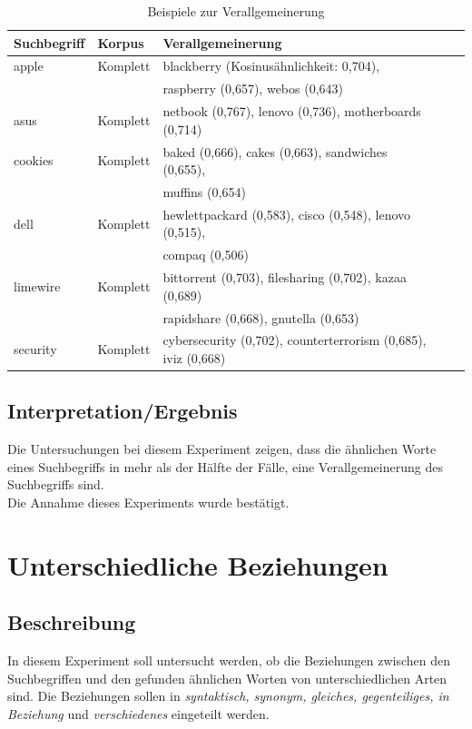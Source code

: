 \documentclass[12pt,a4paper]{report}
\begin{document}
		
\begin{table}[H]
\caption{Beispiele zur Verallgemeinerung}
\begin{center}
\begin{tabular}{|l||l|l|l|l|}
\hline
Suchbegriff & Korpus & Verallgemeinerung   \\
\hline
\hline
 apple & Komplett & blackberry (Kosinusähnlichkeit: 0,704),\\
 	&	& raspberry (0,657), webos (0,643)\\
 \hline
 asus	   & Komplett & netbook (0,767), lenovo (0,736), motherboards (0,714) \\
\hline
 cookies	& Komplett& baked (0,666), cakes (0,663), sandwiches (0,655),\\
 & & muffins (0,654)	\\
 	\hline
 dell	 & Komplett & hewlettpackard (0,583), cisco (0,548), lenovo (0,515),\\
 && compaq (0,506) \\
 \hline
 limewire	& Komplett& bittorrent (0,703), filesharing (0,702), kazaa (0,689)\\
 &&rapidshare (0,668), gnutella (0,653)\\
 	\hline
 security	&	Komplett&	cybersecurity (0,702), counterterrorism (0,685), iviz (0,668) \\
 	\hline
 
\end{tabular}
\end{center}
\end{table}


  
		\subsection{Interpretation/Ergebnis}
		Die Untersuchungen bei diesem Experiment zeigen, dass die ähnlichen Worte eines Suchbegriffs in mehr als der Hälfte der Fälle, eine Verallgemeinerung des Suchbegriffs sind. \\
		Die Annahme dieses Experiments wurde bestätigt.\\
		
		
	
	\section{Unterschiedliche Beziehungen}
		\subsection{Beschreibung}
		In diesem Experiment soll untersucht werden, ob die Beziehungen zwischen den Suchbegriffen und den gefunden ähnlichen Worten von unterschiedlichen Arten sind. Die Beziehungen sollen in \textit{syntaktisch, synonym, gleiches, gegenteiliges, in Beziehung} und \textit{verschiedenes} eingeteilt werden.
\end{document}
